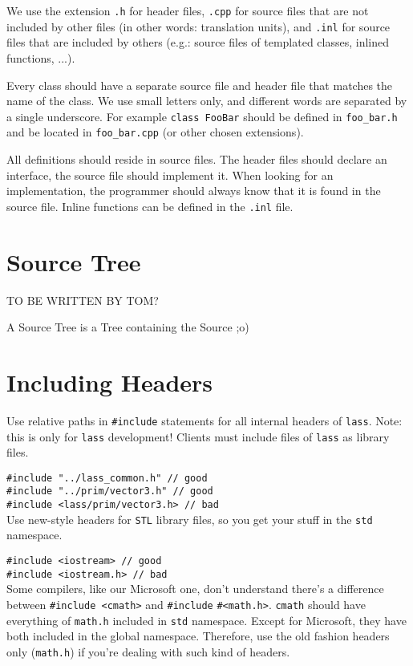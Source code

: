 \documentclass[10pt,a4paper,titlepage,dutch]{report}
\begin{document}
We use the extension \verb|.h| for header files, \verb|.cpp| for
source files that are not included by other files (in other words:
translation units), and \verb|.inl| for source files that are
included by others (e.g.: source files of templated classes,
inlined functions, ...).

Every class should have a separate source file and header file
that matches the name of the class. We use small letters only, and
different words are separated by a single underscore. For example
\verb|class FooBar| should be defined in \verb|foo_bar.h| and be
located in \verb|foo_bar.cpp| (or other chosen extensions).

All definitions should reside in source files. The header files
should declare an interface, the source file should implement it.
When looking for an implementation, the programmer should always
know that it is found in the source file. Inline functions can be
defined in the \verb|.inl| file.

\section{Source Tree}

TO BE WRITTEN BY TOM?

A Source Tree is a Tree containing the Source ;o)

\section{Including Headers}

Use relative paths in \verb|#include| statements for all internal
headers of \verb|lass|.  Note: this is only for \verb|lass|
development!  Clients must include files of \verb|lass| as library
files.

\verb|#include "../lass_common.h" // good|\\
\verb|#include "../prim/vector3.h" // good|\\
\verb|#include <lass/prim/vector3.h> // bad|\\

Use new-style headers for \verb|STL| library files, so you get
your stuff in the \verb|std| namespace.

\verb|#include <iostream> // good|\\
\verb|#include <iostream.h> // bad|\\

Some compilers, like our Microsoft one, don't understand there's a
difference between \verb|#include <cmath>| and \verb|#include|
\verb|#<math.h>|.  \verb|cmath| should have everything of
\verb|math.h| included in \verb|std| namespace.  Except for
Microsoft, they have both included in the global namespace.
Therefore, use the old fashion headers only (\verb|math.h|) if
you're dealing with such kind of headers.
\end{document}
